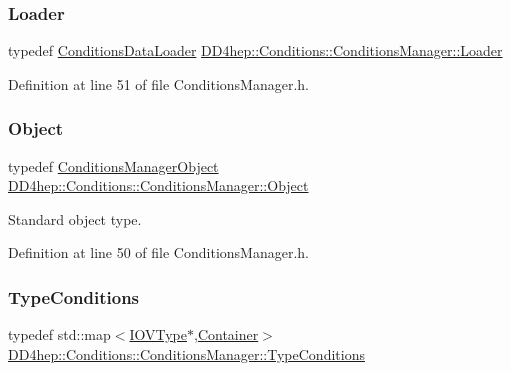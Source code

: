 \subsubsection{\texorpdfstring{Loader}{Loader}}
{\footnotesize\ttfamily typedef \hyperlink{class_d_d4hep_1_1_conditions_1_1_conditions_data_loader}{Conditions\+Data\+Loader} \hyperlink{class_d_d4hep_1_1_conditions_1_1_conditions_manager_acd0f1e242240cc1c07a0d029a716a718}{D\+D4hep\+::\+Conditions\+::\+Conditions\+Manager\+::\+Loader}}



Definition at line 51 of file Conditions\+Manager.\+h.

\hypertarget{class_d_d4hep_1_1_conditions_1_1_conditions_manager_ae865f49d144d8ba5be9eec3e1d8fec94}{}\label{class_d_d4hep_1_1_conditions_1_1_conditions_manager_ae865f49d144d8ba5be9eec3e1d8fec94} 
\subsubsection{\texorpdfstring{Object}{Object}}
{\footnotesize\ttfamily typedef \hyperlink{class_d_d4hep_1_1_conditions_1_1_conditions_manager_object}{Conditions\+Manager\+Object} \hyperlink{class_d_d4hep_1_1_conditions_1_1_conditions_manager_ae865f49d144d8ba5be9eec3e1d8fec94}{D\+D4hep\+::\+Conditions\+::\+Conditions\+Manager\+::\+Object}}



Standard object type. 



Definition at line 50 of file Conditions\+Manager.\+h.

\hypertarget{class_d_d4hep_1_1_conditions_1_1_conditions_manager_a8a7e3616b547ab4aadf035d8ef70f844}{}\label{class_d_d4hep_1_1_conditions_1_1_conditions_manager_a8a7e3616b547ab4aadf035d8ef70f844} 
\subsubsection{\texorpdfstring{Type\+Conditions}{TypeConditions}}
{\footnotesize\ttfamily typedef std\+::map$<$\hyperlink{class_d_d4hep_1_1_i_o_v_type}{I\+O\+V\+Type}$\ast$,\hyperlink{class_d_d4hep_1_1_conditions_1_1_container}{Container}$>$ \hyperlink{class_d_d4hep_1_1_conditions_1_1_conditions_manager_a8a7e3616b547ab4aadf035d8ef70f844}{D\+D4hep\+::\+Conditions\+::\+Conditions\+Manager\+::\+Type\+Conditions}}



